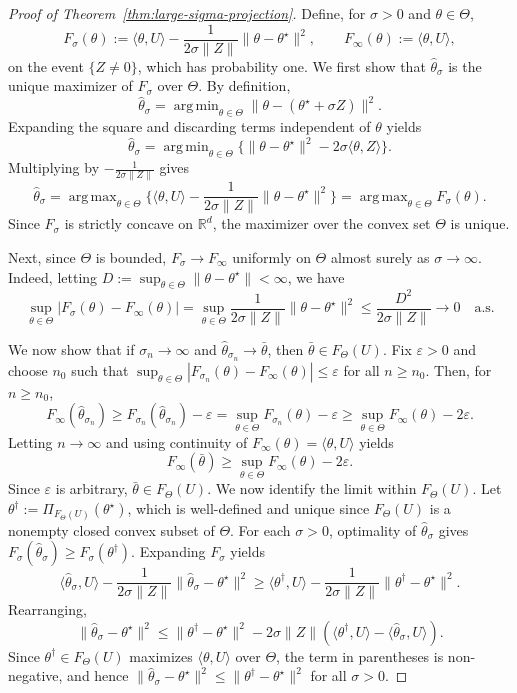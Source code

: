 \documentclass[11pt]{article}
\theoremstyle{plain}
\theoremstyle{definition}
\providecommand{\mathbbm}{\mathbb} %
\newcommand{\R}{\mathbbm{R}}
\newcommand{\hattheta}{\hat{\theta}}
\DeclareMathOperator*{\argmax}{arg\,max}
\DeclareMathOperator*{\argmin}{arg\,min}
\begin{document}
\begin{proof}[Proof of Theorem~\ref{thm:large-sigma-projection}]
Define, for $\sigma>0$ and $\theta \in \Theta$,
\[
F_\sigma(\theta)
:=
\langle \theta,U\rangle-\frac{1}{2\sigma\|Z\|}\|\theta-\theta^\star\|^2,
\qquad
F_\infty(\theta):=\langle \theta,U\rangle,
\]
on the event $\{Z\neq 0\}$, which has probability one. We first show that $\hattheta_\sigma$ is the unique maximizer of $F_\sigma$ over $\Theta$.
By definition,
\[
\hattheta_\sigma
=
\argmin_{\theta\in\Theta}\|\theta-(\theta^\star+\sigma Z)\|^2.
\]
Expanding the square and discarding terms independent of $\theta$ yields
\[
\hattheta_\sigma
=
\argmin_{\theta\in\Theta}\{\|\theta-\theta^\star\|^2-2\sigma\langle \theta,Z\rangle\}.
\]
Multiplying by $-\frac{1}{2\sigma\|Z\|}$ gives
\[
\hattheta_\sigma
=
\argmax_{\theta\in\Theta}
\{\langle \theta,U\rangle-\frac{1}{2\sigma\|Z\|}\|\theta-\theta^\star\|^2\}
=
\argmax_{\theta\in\Theta}F_\sigma(\theta).
\]
Since $F_\sigma$ is strictly concave on $\R^d$, the maximizer over the convex set $\Theta$
is unique.

Next, since $\Theta$ is bounded, $F_\sigma\to F_\infty$ uniformly on $\Theta$ almost surely as $\sigma \to \infty$.
Indeed, letting $D:=\sup_{\theta\in\Theta}\|\theta-\theta^\star\|<\infty$, we have
\[
\sup_{\theta\in\Theta}|F_\sigma(\theta)-F_\infty(\theta)|
=
\sup_{\theta\in\Theta}\frac{1}{2\sigma\|Z\|}\|\theta-\theta^\star\|^2
\le \frac{D^2}{2\sigma\|Z\|}\to 0
\quad\text{a.s.}
\]

 We now show that if $\sigma_n\to\infty$ and $\hattheta_{\sigma_n}\to\bar\theta$, then $\bar\theta\in F_\Theta(U)$.
Fix $\varepsilon>0$ and choose $n_0$ such that
$\sup_{\theta\in\Theta}|F_{\sigma_n}(\theta)-F_\infty(\theta)|\le \varepsilon$
for all $n\ge n_0$.
Then, for $n\ge n_0$,
\[
F_\infty(\hattheta_{\sigma_n})
\ge
F_{\sigma_n}(\hattheta_{\sigma_n})-\varepsilon
=
\sup_{\theta\in\Theta}F_{\sigma_n}(\theta)-\varepsilon
\ge
\sup_{\theta\in\Theta}F_\infty(\theta)-2\varepsilon.
\]
Letting $n\to\infty$ and using continuity of $F_\infty(\theta)=\langle\theta,U\rangle$ yields
\[
F_\infty(\bar\theta)\ge \sup_{\theta\in\Theta}F_\infty(\theta)-2\varepsilon.
\]
Since $\varepsilon$ is arbitrary, $\bar\theta\in F_\Theta(U)$. We now identify the limit within $F_\Theta(U)$.
Let $\theta^\dagger:=\Pi_{F_\Theta(U)}(\theta^\star)$, which is well-defined and unique since
$F_\Theta(U)$ is a nonempty closed convex subset of $\Theta$.
For each $\sigma>0$, optimality of $\hattheta_\sigma$ gives $F_\sigma(\hattheta_\sigma)\ge F_\sigma(\theta^\dagger)$. Expanding $F_\sigma$ yields
\[
\langle \hattheta_\sigma,U\rangle
-\frac{1}{2\sigma\|Z\|}\|\hattheta_\sigma-\theta^\star\|^2
\ge
\langle \theta^\dagger,U\rangle
-\frac{1}{2\sigma\|Z\|}\|\theta^\dagger-\theta^\star\|^2.
\]
Rearranging,
\[
\|\hattheta_\sigma-\theta^\star\|^2
\le
\|\theta^\dagger-\theta^\star\|^2
-
2\sigma\|Z\|(
\langle \theta^\dagger,U\rangle-\langle \hattheta_\sigma,U\rangle).
\]
Since $\theta^\dagger\in F_\Theta(U)$ maximizes $\langle\theta,U\rangle$ over $\Theta$,
the term in parentheses is non-negative, and hence $\|\hattheta_\sigma-\theta^\star\|^2
\le
\|\theta^\dagger-\theta^\star\|^2$ for all $\sigma>0$.


\end{proof}
\end{document}
